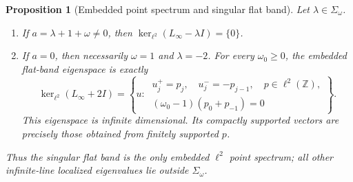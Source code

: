 \documentclass[twoside,10pt]{article}
\numberwithin{equation}{section}
\theoremstyle{slbody}
\newtheorem{proposition}[theorem]{Proposition}
\theoremstyle{definition}
\theoremstyle{remark}
\newcommand{\Z}{\mathbb Z}
\begin{document}
\begin{proposition}[Embedded point spectrum and singular flat band]
\label{prop:embedded-spectrum}
Let $\lambda\in\Sigma_\omega$.
\begin{enumerate}
\item If $a=\lambda+1+\omega\ne0$, then
  $\ker_{\ell^2}(L_\infty-\lambda I)=\{0\}$.
\item If $a=0$, then necessarily $\omega=1$ and $\lambda=-2$.  For every
  $\omega_0\ge0$, the embedded flat-band eigenspace is exactly
  \begin{equation}\label{eq:infinite-flat-eigenspace}
  \ker_{\ell^2}(L_\infty+2I)
  =\left\{u:\
    \begin{array}{l}
    u_j^+=p_j,\quad u_j^-=-p_{j-1},\quad p\in\ell^2(\Z),\\
    (\omega_0-1)(p_0+p_{-1})=0
    \end{array}\right\}.
  \end{equation}
  This eigenspace is infinite dimensional.  Its compactly supported
  vectors are precisely those obtained from finitely supported $p$.
\end{enumerate}
Thus the singular flat band is the only embedded $\ell^2$ point spectrum;
all other infinite-line localized eigenvalues lie outside
$\Sigma_\omega$.
\end{proposition}
\end{document}
